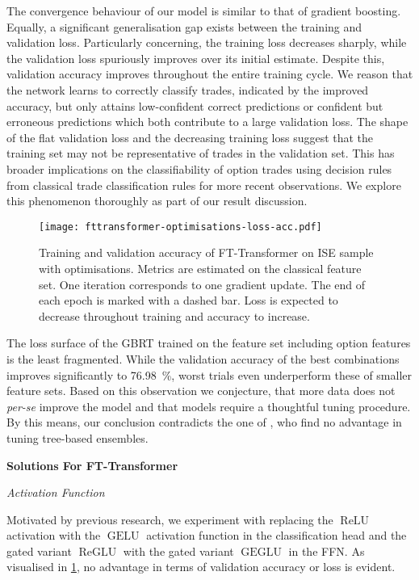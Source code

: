 The convergence behaviour of our model is similar to that of gradient boosting. Equally, a significant generalisation gap exists between the training and validation loss. Particularly concerning, the training loss decreases sharply, while the validation loss spuriously improves over its initial estimate. Despite this, validation accuracy improves throughout the entire training cycle. We reason that the network learns to correctly classify trades, indicated by the improved accuracy, but only attains low-confident correct predictions or confident but erroneous predictions which both contribute to a large validation loss. The shape of the flat validation loss and the decreasing training loss suggest that the training set may not be representative of trades in the validation set. This has broader implications on the classifiability of option trades using decision rules from classical trade classification rules for more recent observations. We explore this phenomenon thoroughly as part of our result discussion.

\begin{figure}[!ht]
    \centering
    \texttt{[image: fttransformer-optimisations-loss-acc.pdf]}
    \caption[Training and Validation Accuracy of FT-Transformer on  with Optimisations]{Training and validation accuracy of FT-Transformer on \gls{ISE} sample with optimisations. Metrics are estimated on the classical feature set. One iteration corresponds to one gradient update. The end of each epoch is marked with a dashed bar. Loss is expected to decrease throughout training and accuracy to increase.}
    \label{fig:fttransformer-optimisations-loss-acc}
\end{figure}
The loss surface of the \gls{GBRT} trained on the feature set including option features is the least fragmented. While the validation accuracy of the best combinations improves significantly to \SI{76.98}{\percent}, worst trials even underperform these of smaller feature sets. Based on this observation we conjecture, that more data does not \emph{per-se} improve the model and that models require a thoughtful tuning procedure. By this means, our conclusion contradicts the one of \textcite[][14]{ronenMachineLearningTrade2022}, who find no advantage in tuning tree-based ensembles.

\textbf{Solutions For FT-Transformer}

\emph{Activation Function}

Motivated by previous research, we experiment with replacing the $\operatorname{ReLU}$ activation with the $\operatorname{GELU}$ activation function \autocite[][2]{hendrycksGaussianErrorLinear2020} in the classification head and the gated variant $\operatorname{ReGLU}$ with the gated variant $\operatorname{GEGLU}$ \autocite[][2]{shazeerGLUVariantsImprove2020} in the \gls{FFN}. As visualised in \cref{fig:fttransformer-optimisations-loss-acc}, no advantage in terms of validation accuracy or loss is evident.

